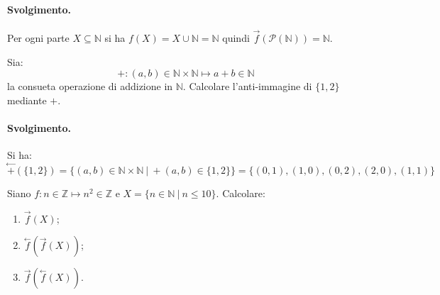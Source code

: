 \paragraph*{Svolgimento.} Per ogni parte $X \subseteq \mathbb{N}$ si ha $f(X)=X \cup \mathbb{N} = \mathbb{N}$ quindi $\stackrel{\rightarrow}{f}(\mathcal{P}(\mathbb{N})) = \mathbb{N}$. \hfill \blacksquare
\begin{exsbox}
	Sia: $$+:(a,b) \in \mathbb{N} \times \mathbb{N} \mapsto a+b \in \mathbb{N}$$ la consueta operazione di addizione in $\mathbb{N}$. Calcolare l'anti-immagine di $\{1,2\}$ mediante $+$.
\end{exsbox}
\paragraph*{Svolgimento.} Si ha:
\begin{displaymath}
	\stackrel{\leftarrow}{+}(\{1,2\}) = \bigl\{(a,b) \in \mathbb{N} \times \mathbb{N} \ | \ +(a,b) \in \{1,2\}\bigr\} = \{(0,1),(1,0),(0,2),(2,0),(1,1)\}
\end{displaymath}
\begin{flushright}
	\blacksquare
\end{flushright}
\begin{exsbox}
	Siano $f: n \in \mathbb{Z} \mapsto n^{2} \in \mathbb{Z}$ e $X=\{n \in \mathbb{N} \ | \ n \leq 10 \}$. Calcolare:
	\begin{enumerate}
		\item 	$\stackrel{\rightarrow}{f}(X)$;
		\item 	$\stackrel{\leftarrow}{f}(\stackrel{\rightarrow}{f}(X))$;
		\item 	$\stackrel{\rightarrow}{f}(\stackrel{\leftarrow}{f}(X))$.
	\end{enumerate}
\end{exsbox}
